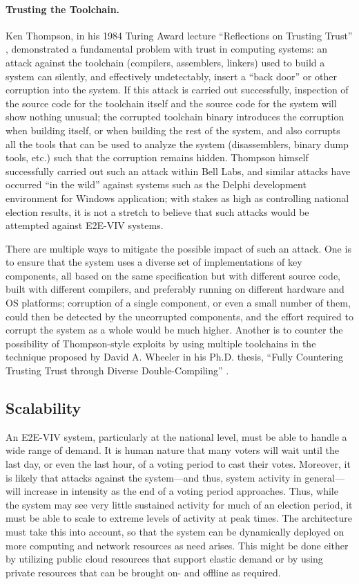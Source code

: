 \paragraph{Trusting the Toolchain.} Ken Thompson, in his 1984 Turing
Award lecture ``Reflections on Trusting Trust'' \cite{Thompson84},
demonstrated a fundamental problem with trust in computing systems: an
attack against the toolchain (compilers, assemblers, linkers) used to
build a system can silently, and effectively undetectably, insert a
``back door'' or other corruption into the system. If this attack is
carried out successfully, inspection of the source code for the
toolchain itself and the source code for the system will show nothing
unusual; the corrupted toolchain binary introduces the corruption when
building itself, or when building the rest of the system, and also
corrupts all the tools that can be used to analyze the system
(disassemblers, binary dump tools, etc.) such that the corruption
remains hidden. Thompson himself successfully carried out such an
attack within Bell Labs, and similar attacks have occurred ``in the
wild'' against systems such as the Delphi development environment for
Windows application; with stakes as high as controlling national
election results, it is not a stretch to believe that such attacks
would be attempted against E2E-VIV systems.

There are multiple ways to mitigate the possible impact of such an
attack. One is to ensure that the system uses a diverse set of
implementations of key components, all based on the same specification
but with different source code, built with different compilers, and
preferably running on different hardware and OS platforms; corruption
of a single component, or even a small number of them, could then be
detected by the uncorrupted components, and the effort required to
corrupt the system as a whole would be much higher. Another is to
counter the possibility of Thompson-style exploits by using multiple
toolchains in the technique proposed by David A. Wheeler in his
Ph.D. thesis, ``Fully Countering Trusting Trust through Diverse
Double-Compiling'' \cite{Wheeler09}.

\subsection{Scalability}

An E2E-VIV system, particularly at the national level, must be able to
handle a wide range of demand. It is human nature that many voters
will wait until the last day, or even the last hour, of a voting
period to cast their votes. Moreover, it is likely that attacks
against the system---and thus, system activity in general---will
increase in intensity as the end of a voting period approaches. Thus,
while the system may see very little sustained activity for much of an
election period, it must be able to scale to extreme levels of
activity at peak times. The architecture must take this into account,
so that the system can be dynamically deployed on more computing and
network resources as need arises. This might be done either by
utilizing public cloud resources that support elastic demand or by
using private resources that can be brought on- and offline as
required.

